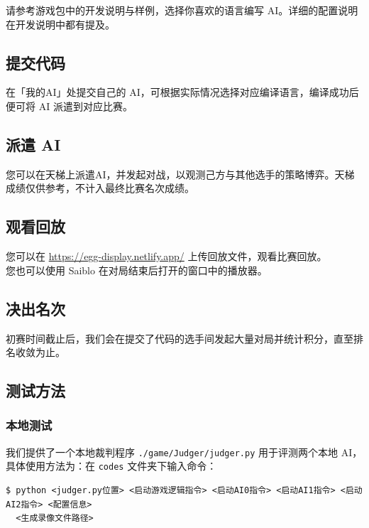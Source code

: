 \documentclass[UTF8]{article}
\begin{document}
请参考游戏包中的开发说明与样例，选择你喜欢的语言编写
AI。详细的配置说明在开发说明中都有提及。

\hypertarget{header-n41}{%
\subsection{提交代码}\label{header-n41}}

在「我的AI」处提交自己的
AI，可根据实际情况选择对应编译语言，编译成功后便可将 AI 派遣到对应比赛。

\hypertarget{header-n43}{%
\subsection{派遣 AI}\label{header-n43}}

您可以在天梯上派遣AI，并发起对战，以观测己方与其他选手的策略博弈。天梯成绩仅供参考，不计入最终比赛名次成绩。

\hypertarget{header-n45}{%
\subsection{观看回放}\label{header-n45}}

您可以在 \url{https://egg-display.netlify.app/} 上传回放文件，观看比赛回放。\\
您也可以使用 Saiblo 在对局结束后打开的窗口中的播放器。

\hypertarget{header-n47}{%
\subsection{决出名次}\label{header-n47}}

初赛时间截止后，我们会在提交了代码的选手间发起大量对局并统计积分，直至排名收敛为止。

\hypertarget{header-n49}{%
\subsection{测试方法}\label{header-n49}}

\hypertarget{header-n50}{%
\subsubsection{本地测试}\label{header-n50}}

我们提供了一个本地裁判程序 \texttt{./game/Judger/judger.py}
用于评测两个本地 AI，具体使用方法为：在 \texttt{codes} 文件夹下输入命令：

\begin{verbatim}
$ python <judger.py位置> <启动游戏逻辑指令> <启动AI0指令> <启动AI1指令> <启动AI2指令> <配置信息>
  <生成录像文件路径>
\end{verbatim}
\end{document}

